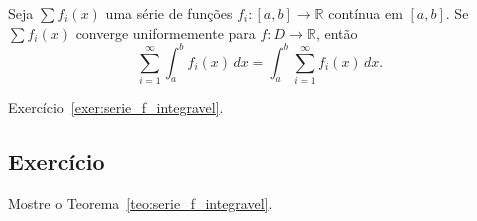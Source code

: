 \begin{teo}\label{teo:serie_f_integravel}
  Seja $\sum f_i(x)$ uma série de funções $f_i:[a, b]\to\mathbb{R}$ contínua em $[a, b]$. Se $\sum f_i(x)$ converge uniformemente para $f:D\to\mathbb{R}$, então
  \begin{equation}
    \sum_{i=1}^\infty \int_a^b f_i(x)\,dx = \int_a^b \sum_{i=1}^\infty f_i(x)\,dx.
  \end{equation}
\end{teo}
\begin{dem}
  Exercício~\ref{exer:serie_f_integravel}.
\end{dem}

\subsection*{Exercício}

\begin{exer}\label{exer:serie_f_integravel}
  Mostre o Teorema~\ref{teo:serie_f_integravel}.
\end{exer}

